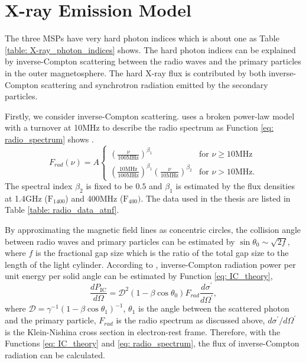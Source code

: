 \documentclass[a4paper, 12pt]{report}
\begin{document}
  \section{X-ray Emission Model}
    The three MSPs have very hard photon indices which is about one as Table 
    \ref{table: X-ray_photon_indices} shows. The hard photon indices can be explained by 
    inverse-Compton scattering between the radio waves and the primary particles in the 
    outer magnetosphere. The hard X-ray flux is contributed by both inverse-Compton 
    scattering and synchrotron radiation emitted by the secondary particles. 
    
    Firstly, we consider inverse-Compton scattering. \cite{0004-637X-787-2-167} uses a 
    broken power-law model with a turnover at 10MHz to describe the radio spectrum as 
    Function \ref{eq: radio_spectrum} shows \cite{0004-637X-787-2-167}.
    \begin{equation}
      \label{eq: radio_spectrum}
        F_{rad}\left(\nu\right) = A \left.
        \begin{cases}
          \left(\frac{\nu}{100\text{MHz}}\right)^{\beta_1} & \text{for } \nu \geq 10\text{MHz} \\
          \left(\frac{10\text{MHz}}{100\text{MHz}}\right)^{\beta_1} \left(\frac{\nu}{10\text{MHz}}\right)^{\beta_2}& \text{for } \nu > 10\text{MHz} .
        \end{cases}     
        \right.  
    \end{equation} 
    The spectral index $\beta_2$ is fixed to be $0.5$ and $\beta_1$ is estimated by the 
    flux densities at 1.4GHz ($\mbox{F}_{1400}$) and 400MHz ($\mbox{F}_{400})$. The data 
    used in the thesis are listed in Table \ref{table: radio_data_atnf}. 

    By approximating the magnetic field lines as concentric circles, the collision angle 
    between radio waves and primary particles can be estimated by 
    $\sin{\theta_0}\sim \sqrt{2f}$, where $f$ is the fractional gap size which is the 
    ratio of the total gap size to the length of the light cylinder. According to 
    \cite{0004-637X-787-2-167}, inverse-Compton radiation power per unit energy per solid 
    angle can be estimated by Function \ref{eq: IC_theory},
    \begin{equation}
      \label{eq: IC_theory}
      \frac{dP_\text{IC}}{d\Omega} = \mathcal{D}^{2}\left(1-\beta \cos{\theta_{0}}\right) F_{rad} \frac{d\sigma^{\prime}}{d\Omega^{\prime}} ,
    \end{equation}
    where  $\mathcal{D} = \gamma^{-1}\left(1-\beta\cos{\theta_1}
    \right)^{-1}$, $\theta_1$ is the angle between the scattered photon and the primary particle, 
    $F_{rad}$ is the radio spectrum 
    as discussed above, $d\sigma^{\prime}/d\Omega^{\prime}$ is the Klein-Nishina cross 
    section in electron-rest frame.
    Therefore, with the Functions \ref{eq: IC_theory} and \ref{eq: radio_spectrum}, the 
    flux of inverse-Compton radiation can be calculated. 
\end{document}
